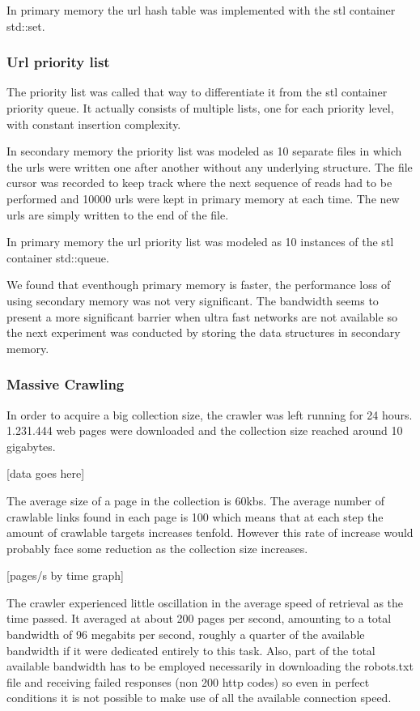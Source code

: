 \documentclass{acmart}
\begin{document}
In primary memory the url hash table was implemented with the stl container std::set.

\subsubsection{Url priority list}
The priority list was called that way to differentiate it from the stl container priority queue. 
It actually consists of multiple lists, one for each priority level, with constant insertion complexity.

In secondary memory the priority list was modeled as 10 separate files in which the urls were written one after another
without any underlying structure. The file cursor was recorded to keep track where the next sequence of reads had to be
performed and 10000 urls were kept in primary memory at each time. The new urls are simply written to the end of the file.

In primary memory the url priority list was modeled as 10 instances of the stl container std::queue.

We found that eventhough primary memory is faster, the performance loss of using secondary memory was not
very significant. The bandwidth seems to present a more significant barrier when ultra fast networks are
not available so the next experiment was conducted by storing the data structures in secondary memory.

\subsubsection{Massive Crawling}
In order to acquire a big collection size, the crawler was left running for 24 hours. 1.231.444 web pages were
downloaded and the collection size reached around 10 gigabytes.

[data goes here]

The average size of a page in the collection is 60kbs. The average number of crawlable links found in each page 
is 100 which means that at each step the amount of crawlable targets increases tenfold. However this rate of increase
would probably face some reduction as the collection size increases.

[pages/s by time graph]

The crawler experienced little oscillation in the average speed of retrieval as the time passed. 
It averaged at about 200 pages per second, amounting to a total bandwidth of 96 megabits per second, 
roughly a quarter of the available bandwidth if it were dedicated entirely to this task.
Also, part of the total available bandwidth has to be employed necessarily in downloading the 
robots.txt file and receiving failed responses (non 200 http codes) so even in perfect conditions
it is not possible to make use of all the available connection speed.
\end{document}

